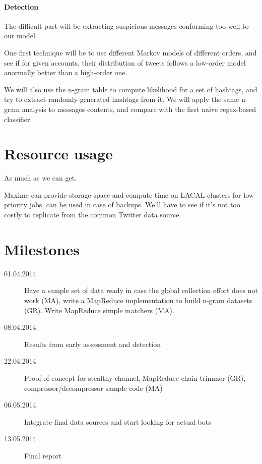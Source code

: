 \documentclass[a4paper,11pt]{article}
\begin{document}
\paragraph{Detection}

The difficult part will be extracting suspicious messages conforming too well to our model. 

One first technique will be to use different Markov models of different orders, and see if for given accounts, their distribution of tweets follows a low-order model anormally better than a high-order one.

We will also use the n-gram table to compute likelihood for a set of hashtags, and try to extract randomly-generated hashtags from it. We will apply the same n-gram analysis to messages contents, and compare with the first naive regex-based classifier.

\section{Resource usage}

As much as we can get.

Maxime can provide storage space and compute time on LACAL clusters for low-priority jobs, can be used in case of backups. We'll have to see if it's not too costly to replicate from the common Twitter data source.

\section{Milestones}

\begin{description}
	\item[01.04.2014] Have a sample set of data ready in case the global collection effort does not work (MA), write a MapReduce implementation to build n-gram datasets (GR). Write MapReduce simple matchers (MA).
	\item[08.04.2014] Results from early assessment and detection
	\item[22.04.2014] Proof of concept for stealthy channel, MapReduce chain trimmer (GR), compressor/decompressor sample code (MA)
	\item[06.05.2014] Integrate final data sources and start looking for actual bots
	\item[13.05.2014] Final report 
\end{description}
\end{document}

